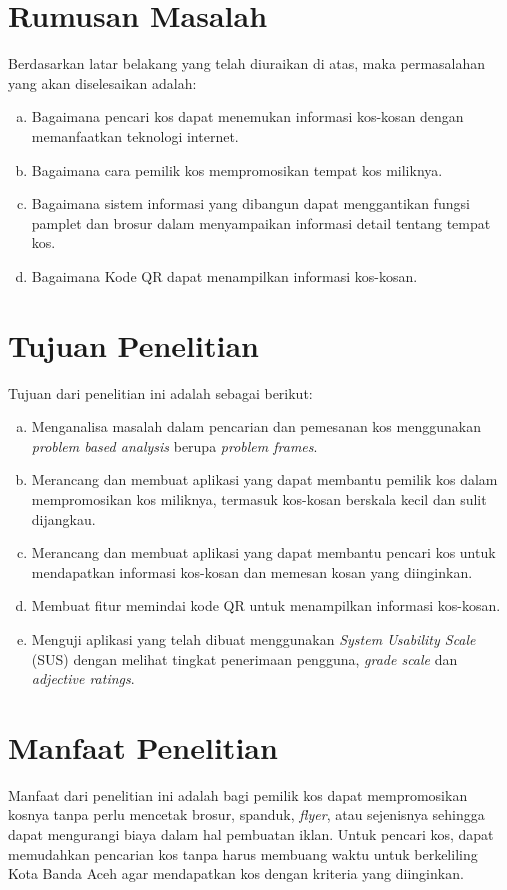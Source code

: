\section{Rumusan Masalah}
Berdasarkan latar belakang yang telah diuraikan di atas, maka permasalahan yang akan diselesaikan adalah:
	\begin{enumerate}[a.]
		\item Bagaimana pencari kos dapat menemukan informasi kos-kosan dengan memanfaatkan teknologi internet.
		\item Bagaimana cara pemilik kos mempromosikan tempat kos miliknya.
		\item Bagaimana sistem informasi yang dibangun dapat menggantikan fungsi pamplet dan brosur dalam menyampaikan informasi detail tentang tempat kos.
		\item Bagaimana Kode QR dapat menampilkan informasi kos-kosan.
	\end{enumerate}


\section{Tujuan Penelitian}
Tujuan dari penelitian ini adalah sebagai berikut:
	\begin{enumerate}[a.]
		\item Menganalisa masalah dalam pencarian dan pemesanan kos menggunakan \textit{problem based analysis} berupa \textit{problem frames}.
		\item Merancang dan membuat aplikasi yang dapat membantu pemilik kos dalam mempromosikan kos miliknya, termasuk kos-kosan berskala kecil dan sulit dijangkau.
		\item Merancang dan membuat aplikasi yang dapat membantu pencari kos untuk mendapatkan informasi kos-kosan dan memesan kosan yang diinginkan.
		\item Membuat fitur memindai kode QR untuk menampilkan informasi kos-kosan. 
		\item Menguji aplikasi yang telah dibuat menggunakan \textit{System Usability Scale} (SUS) dengan melihat tingkat penerimaan pengguna, \textit{grade scale} dan \textit{adjective ratings}.
	\end{enumerate}


\section{Manfaat Penelitian}
Manfaat dari penelitian ini adalah bagi pemilik kos dapat mempromosikan kosnya tanpa perlu mencetak brosur, spanduk, \textit{flyer}, atau sejenisnya sehingga dapat mengurangi biaya dalam hal pembuatan iklan. Untuk pencari kos, dapat memudahkan pencarian kos tanpa harus membuang waktu untuk berkeliling Kota Banda Aceh agar mendapatkan kos dengan kriteria yang diinginkan.


